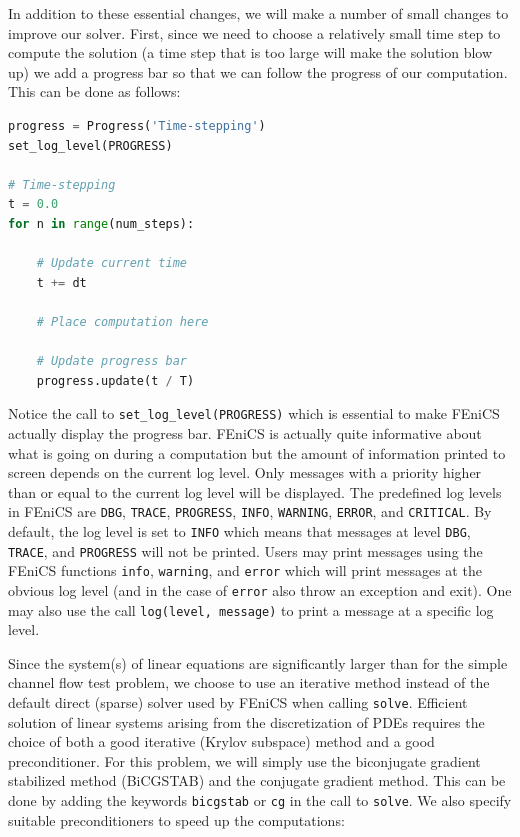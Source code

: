 \documentclass[graybox,envcountchap,sectrefs,final]{svmonodo}
\newenvironment{notice_mdfboxadmon}[1][]{
\begin{notice_mdfboxmdframed}[frametitle=#1]
}
{
\end{notice_mdfboxmdframed}
}
\begin{document}

In addition to these essential changes, we will make a number of small
changes to improve our solver. First, since we need to choose a
relatively small time step to compute the solution (a time step that
is too large will make the solution blow up) we add a progress bar so
that we can follow the progress of our computation. This can be done
as follows:


\begin{lstlisting}[language=Python,style=graycolor]
progress = Progress('Time-stepping')
set_log_level(PROGRESS)

# Time-stepping
t = 0.0
for n in range(num_steps):

    # Update current time
    t += dt

    # Place computation here

    # Update progress bar
    progress.update(t / T)
\end{lstlisting}

\begin{notice_mdfboxadmon}
Notice the call to \Verb!set_log_level(PROGRESS)! which is essential to
make FEniCS actually display the progress bar. FEniCS is actually
quite informative about what is going on during a computation but the
amount of information printed to screen depends on the current log
level. Only messages with a priority higher than or equal to the
current log level will be displayed. The predefined log levels in
FEniCS are
\texttt{DBG},
\texttt{TRACE},
\texttt{PROGRESS},
\texttt{INFO},
\texttt{WARNING},
\texttt{ERROR}, and
\texttt{CRITICAL}. By default, the log level is set to \texttt{INFO} which means
that messages at level \texttt{DBG}, \texttt{TRACE}, and \texttt{PROGRESS} will not be
printed. Users may print messages using the FEniCS functions \texttt{info},
\texttt{warning}, and \texttt{error} which will print messages at the obvious log
level (and in the case of \texttt{error} also throw an exception and
exit). One may also use the call \texttt{log(level, message)} to print a
message at a specific log level.
\end{notice_mdfboxadmon} %

Since the system(s) of linear equations are significantly larger than
for the simple channel flow test problem, we choose to use an
iterative method instead of the default direct (sparse) solver used by
FEniCS when calling \texttt{solve}. Efficient solution of linear systems
arising from the discretization of PDEs requires the choice of both a
good iterative (Krylov subspace) method and a good
preconditioner. For this problem, we will simply use the biconjugate
gradient stabilized method (BiCGSTAB) and the conjugate gradient method. This can be done by adding the
keywords \texttt{bicgstab} or \texttt{cg} in the call to \texttt{solve}. We also specify
suitable preconditioners to speed up the computations:
\end{document}
